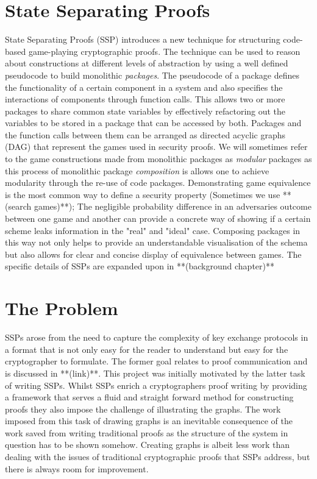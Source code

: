 \documentclass[bsc,frontabs,singlespacing,parskip,deptreport]{infthesis}
\begin{document}
\section{State Separating Proofs}
State Separating Proofs (SSP) \cite{ssp} introduces a new technique for structuring code-based game-playing cryptographic proofs. The technique can be used to reason about constructions at different levels of abstraction by using a well defined pseudocode to build monolithic \textit{packages}. The pseudocode of a package defines the functionality of a certain component in a system and also specifies the interactions of components through function calls. This allows two or more packages to share common state variables by effectively refactoring out the variables to be stored in a package that can be accessed by both. Packages and the function calls between them can be arranged as directed acyclic graphs (DAG) that represent the games used in security proofs. We will sometimes refer to the game constructions made from monolithic packages as \textit{modular} packages as this process of monolithic package \textit{composition} is allows one to achieve modularity through the re-use of code packages. Demonstrating game equivalence is the most common way to define a security property (Sometimes we use **(search games)**); The negligible probability difference in an adversaries outcome between one game and another can provide a concrete way of showing if a certain scheme leaks information in the "real" and "ideal" case. Composing packages in this way not only helps to provide an understandable visualisation of the schema but also allows for clear and concise display of equivalence between games. The specific details of SSPs are expanded upon in **(background chapter)**

\section{The Problem}
SSPs arose from the need to capture the complexity of key exchange protocols in a format that is not only easy for the reader to understand but easy for the cryptographer to formulate. The former goal relates to proof communication and is discussed in **(link)**. This project was initially motivated by the latter task of writing SSPs. Whilst SSPs enrich a cryptographers proof writing by providing a framework that serves a fluid and straight forward method for constructing proofs they also impose the challenge of illustrating the graphs. The work imposed from this task of drawing graphs is an inevitable consequence of the work saved from writing traditional proofs as the structure of the system in question has to be shown somehow. Creating graphs is albeit less work than dealing with the issues of traditional cryptographic proofs that SSPs address, but there is always room for improvement.
\end{document}
